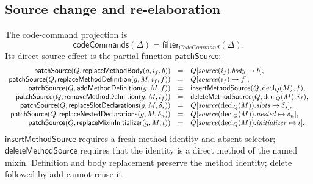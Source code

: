 \subsection{Source change and re-elaboration}

The code-command projection is
\begin{equation}\label{eq:code-command-projection}
 \mathsf{codeCommands}(\Delta)=
 \mathsf{filter}_{\mathit{CodeCommand}}(\Delta).
\end{equation}
Its direct source effect is the partial function $\mathsf{patchSource}$:
\begin{equation}\label{eq:source-patch}
\begin{array}{rcl}
 \mathsf{patchSource}(Q,\mathsf{replaceMethodBody}(g,i_f,b))
   &=&Q[\mathit{source}(i_f).\mathit{body}\mapsto b],\\
 \mathsf{patchSource}(Q,\mathsf{replaceMethodDefinition}(g,M,i_f,f))
   &=&Q[\mathit{source}(i_f)\mapsto f],\\
 \mathsf{patchSource}(Q,\mathsf{addMethodDefinition}(g,M,f))
   &=&\mathsf{insertMethodSource}(Q,\mathop{\mathrm{decl}}_Q(M),f),\\
 \mathsf{patchSource}(Q,\mathsf{removeMethodDefinition}(g,M,i_f))
   &=&\mathsf{deleteMethodSource}(Q,\mathop{\mathrm{decl}}_Q(M),i_f),\\
 \mathsf{patchSource}(Q,\mathsf{replaceSlotDeclarations}(g,M,\delta_s))
   &=&Q[\mathit{source}(\mathop{\mathrm{decl}}_Q(M)).\mathit{slots}\mapsto\delta_s],\\
 \mathsf{patchSource}(Q,\mathsf{replaceNestedDeclarations}(g,M,\delta_n))
   &=&Q[\mathit{source}(\mathop{\mathrm{decl}}_Q(M)).\mathit{nested}\mapsto\delta_n],\\
 \mathsf{patchSource}(Q,\mathsf{replaceMixinInitializer}(g,M,\iota))
   &=&Q[\mathit{source}(\mathop{\mathrm{decl}}_Q(M)).\mathit{initializer}\mapsto\iota].
\end{array}
\end{equation}
$\mathsf{insertMethodSource}$ requires a fresh method identity and absent
selector; $\mathsf{deleteMethodSource}$ requires that the identity is a direct
method of the named mixin.  Definition and body replacement preserve the
method identity; delete followed by add cannot reuse it.

